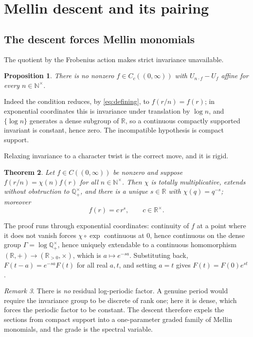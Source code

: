 \documentclass[11pt]{amsart}
\newtheorem{theorem}{Theorem}[section]
\newtheorem{proposition}[theorem]{Proposition}
\theoremstyle{definition}
\theoremstyle{remark}
\newtheorem{remark}[theorem]{Remark}
\newcommand{\R}{\mathbb R}
\newcommand{\N}{\mathbb N}
\newcommand{\Q}{\mathbb Q}
\begin{document}
\section{Mellin descent and its pairing}

\subsection{The descent forces Mellin monomials}

The quotient by the Frobenius action makes strict invariance unavailable.

\begin{proposition}\label{prop:strict}
There is no nonzero $f\in C_c((0,\infty))$ with $U_{n\cdot f}-U_f$ affine for
every $n\in\N^\times$.
\end{proposition}

Indeed the condition reduces, by \eqref{eq:defining}, to $f(r/n)=f(r)$; in
exponential coordinates this is invariance under translation by $\log n$, and
$\{\log n\}$ generates a dense subgroup of $\R$, so a continuous compactly
supported invariant is constant, hence zero.  The incompatible hypothesis is
compact support.

Relaxing invariance to a character twist is the correct move, and it is
rigid.

\begin{theorem}\label{thm:classification}
Let $f\in C((0,\infty))$ be nonzero and suppose $f(r/n)=\chi(n)f(r)$ for all
$n\in\N^\times$.  Then $\chi$ is totally multiplicative, extends without
obstruction to $\Q^\times_+$, and there is a unique $s\in\R$ with
$\chi(q)=q^{-s}$; moreover
\[
 f(r)=c\,r^{s},\qquad c\in\R^\times .
\]
\end{theorem}

The proof runs through exponential coordinates: continuity of $f$ at a point
where it does not vanish forces $\chi\circ\exp$ continuous at $0$, hence
continuous on the dense group $\Gamma=\log\Q^\times_+$, hence uniquely
extendable to a continuous homomorphism $(\R,+)\to(\R_{>0},\times)$, which is
$a\mapsto e^{-sa}$.  Substituting back, $F(t-a)=e^{-sa}F(t)$ for all real
$a,t$, and setting $a=t$ gives $F(t)=F(0)e^{st}$.

\begin{remark}
There is \emph{no} residual log-periodic factor.  A genuine period would
require the invariance group to be discrete of rank one; here it is dense,
which forces the periodic factor to be constant.  The descent therefore
expels the sections from compact support into a one-parameter graded family
of Mellin monomials, and the grade is the spectral variable.
\end{remark}
\end{document}
